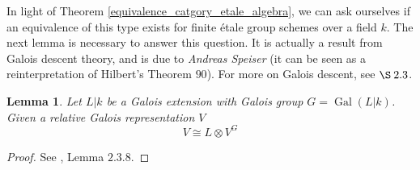 \documentclass{article}
\theoremstyle{plain}
\newtheorem{lemma}[theorem]{Lemma}
\theoremstyle{definition}
\DeclareMathOperator{\Gal}{Gal}
\begin{document}

\noindent In light of Theorem \ref{equivalence_catgory_etale_algebra}, we can ask ourselves if an equivalence of this type exists for finite \'etale group schemes over a field $k$.
The next lemma is necessary to answer this question. It is actually a result from Galois descent theory, and is due to \textit{Andreas Speiser} (it can be seen as a reinterpretation of Hilbert's Theorem $90$). For more on Galois descent, see \cite{galois_descent_Szamuely} $\S\: 2.3$.


\begin{lemma}
\label{descent_argument}
    Let $L|k$ be a Galois extension with Galois group $G=\Gal(L|k)$.
    Given a relative Galois representation $V$
    $$V \cong L \otimes V^G$$
\end{lemma}
\begin{proof}
    See \cite{galois_descent_Szamuely}, Lemma $2.3.8$.
\end{proof}
\end{document}
